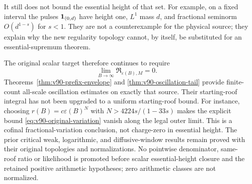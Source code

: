 It still does not bound the essential height of that set. For example,
on a fixed interval the pulses $\mathbf1_{(0,d)}$ have height one,
$L^1$ mass $d$, and fractional seminorm $O(d^{1-s})$ for $s<1$.
They are not a counterexample for the physical source; they explain
why the new regularity topology cannot, by itself, be substituted for
an essential-supremum theorem.

The original scalar target therefore continues to require
\[
 \lim_{B\to\infty}\mathfrak R_{\varepsilon(B),M}=0.
\]
Theorems~\ref{thm:v90-prefix-envelope} and
\ref{thm:v90-oscillation-tail} provide finite-count all-scale
oscillation estimates on exactly that source. Their starting-roof
integral has not been upgraded to a uniform starting-roof bound.
For instance, choosing $r(B)=c\varepsilon(B)^N$ with
$N>4224s/(1-33s)$ makes the explicit bound
\eqref{eq:v90-original-variation} vanish along the legal outer limit.
This is a cofinal fractional-variation conclusion, not charge-zero in
essential height. The prior critical weak, logarithmic, and diffusive-window results
remain proved with their original topologies and normalizations.
No pointwise denominator, same-roof ratio or likelihood is promoted
before scalar essential-height closure and the retained positive
arithmetic hypotheses; zero arithmetic classes are not normalized.
